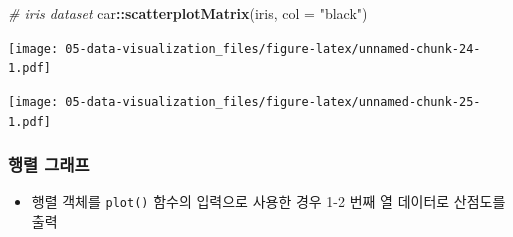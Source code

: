 \documentclass[
  11pt,
]{krantz}
\newenvironment{Shaded}{\begin{snugshade}}{\end{snugshade}}
\newcommand{\CommentTok}[1]{\textcolor[rgb]{0.37,0.37,0.37}{\textit{#1}}}
\newcommand{\DataTypeTok}[1]{\textcolor[rgb]{0.27,0.27,0.27}{#1}}
\newcommand{\DecValTok}[1]{\textcolor[rgb]{0.06,0.06,0.06}{#1}}
\newcommand{\KeywordTok}[1]{\textcolor[rgb]{0.27,0.27,0.27}{\textbf{#1}}}
\newcommand{\NormalTok}[1]{#1}
\newcommand{\OperatorTok}[1]{\textcolor[rgb]{0.43,0.43,0.43}{\textbf{#1}}}
\newcommand{\OtherTok}[1]{\textcolor[rgb]{0.37,0.37,0.37}{#1}}
\newcommand{\StringTok}[1]{\textcolor[rgb]{0.5,0.5,0.5}{#1}}
\providecommand{\tightlist}{%
  \setlength{\itemsep}{0pt}\setlength{\parskip}{0pt}}
\begin{document}
\footnotesize

\begin{Shaded}
\begin{Highlighting}[]
\CommentTok{# iris dataset}
\NormalTok{car}\OperatorTok{::}\KeywordTok{scatterplotMatrix}\NormalTok{(iris, }\DataTypeTok{col =} \StringTok{"black"}\NormalTok{)}
\end{Highlighting}
\end{Shaded}

\texttt{[image: 05-data-visualization\_files/figure-latex/unnamed-chunk-24-1.pdf]}

\normalsize

\footnotesize

\begin{Shaded}
\end{Shaded}

\texttt{[image: 05-data-visualization\_files/figure-latex/unnamed-chunk-25-1.pdf]}

\normalsize

\hypertarget{mat-plot}{%
\subsubsection*{행렬 그래프}\label{mat-plot}}


\begin{itemize}
\tightlist
\item
  행렬 객체를 \texttt{plot()} 함수의 입력으로 사용한 경우 1-2 번째 열 데이터로 산점도를 출력
\end{itemize}

\footnotesize
\end{document}
